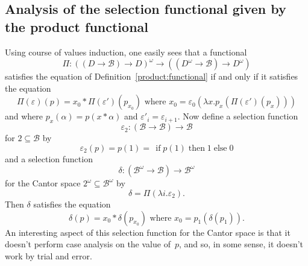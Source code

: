 \documentclass{LMCS}
\newcommand{\e}{\varepsilon}
\renewcommand{\d}{\delta}
\newcommand{\licsmath}[1]{\[ #1 \]}
\newcommand{\pBool}{\mathcal{B}}
\newcommand{\If}{\,\mathrel{\operatorname{if}}}
\newcommand{\Then}{\mathrel{\operatorname{then}}}
\newcommand{\Else}{\mathrel{\operatorname{else}}}
\newcommand{\True}{1}\newcommand{\False}{0}\newcommand{\domain}[1]{{\D_{#1}}}
\newcommand{\D}{D}
\begin{document}
\subsection{Analysis of the selection functional given by the product functional}

\newcommand{\eval}{\operatorname{eval}}

Using course of values induction, one easily sees that a functional
\licsmath{\Pi \colon ((\D \to
  \pBool) \to \D)^\omega \to ((\D^\omega \to \pBool) \to \D^\omega)}
satisfies the equation of Definition~\ref{product:functional} if and
only if it satisfies the equation
\[
\text{$\Pi(\e)(p) = x_0 * \Pi(\e')(p_{x_0})$ where $x_0 = \e_0(\lambda x. p_x(\Pi(\e')(p_x)))$}
\]
and where $p_x(\alpha) = p(x * \alpha)$ and $\e'_i = \e_{i+1}$.  Now
define a selection function \[ \e_2 \colon (\pBool \to \pBool) \to
\pBool \] for $2 \subseteq \pBool$ by
\[
\e_2(p) = p(\True) = \If p(\True) \Then 1 \Else 0
\]
and a selection function \[ \d \colon (\pBool^\omega \to \pBool) \to
\pBool^\omega\] for the Cantor space $2^\omega \subseteq \pBool^\omega$ by
\[
\d = \Pi(\lambda i.\e_{2}).
\]
Then $\d$ satisfies the equation
\[
\text{$\d(p) = x_0 * \d(p_{x_0})$ where $x_0 = p_1(\d(p_1))$.}
\]
An interesting aspect of this selection function for the Cantor space
is that it doesn't perform case analysis on the value of~$p$, and so,
in some sense, it doesn't work by trial and error.
\end{document}

